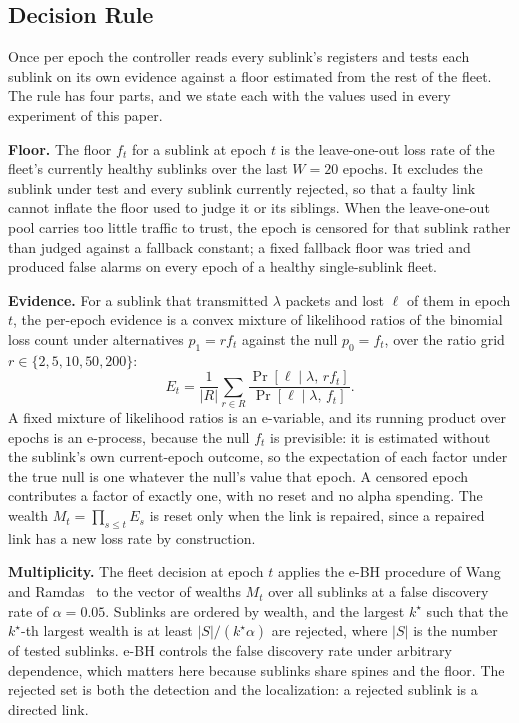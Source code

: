 \subsection{Decision Rule}
\label{sec:decision}

Once per epoch the controller reads every sublink's registers and tests each sublink on its own evidence against a floor estimated from the rest of the fleet. The rule has four parts, and we state each with the values used in every experiment of this paper.

\textbf{Floor.} The floor $f_t$ for a sublink at epoch $t$ is the leave-one-out loss rate of the fleet's currently healthy sublinks over the last $W=20$ epochs. It excludes the sublink under test and every sublink currently rejected, so that a faulty link cannot inflate the floor used to judge it or its siblings. When the leave-one-out pool carries too little traffic to trust, the epoch is censored for that sublink rather than judged against a fallback constant; a fixed fallback floor was tried and produced false alarms on every epoch of a healthy single-sublink fleet.

\textbf{Evidence.} For a sublink that transmitted $\lambda$ packets and lost $\ell$ of them in epoch $t$, the per-epoch evidence is a convex mixture of likelihood ratios of the binomial loss count under alternatives $p_1 = r f_t$ against the null $p_0 = f_t$, over the ratio grid $r \in \{2, 5, 10, 50, 200\}$:
\begin{equation}
E_t = \frac{1}{|R|}\sum_{r\in R}\frac{\Pr\!\left[\ell \mid \lambda,\, r f_t\right]}{\Pr\!\left[\ell \mid \lambda,\, f_t\right]}.
\label{eq:evalue}
\end{equation}
A fixed mixture of likelihood ratios is an e-variable, and its running product over epochs is an e-process, because the null $f_t$ is previsible: it is estimated without the sublink's own current-epoch outcome, so the expectation of each factor under the true null is one whatever the null's value that epoch. A censored epoch contributes a factor of exactly one, with no reset and no alpha spending. The wealth $M_t = \prod_{s \le t} E_s$ is reset only when the link is repaired, since a repaired link has a new loss rate by construction.

\textbf{Multiplicity.} The fleet decision at epoch $t$ applies the e-BH procedure of Wang and Ramdas~\cite{ebh} to the vector of wealths $M_t$ over all sublinks at a false discovery rate of $\alpha = 0.05$. Sublinks are ordered by wealth, and the largest $k^\star$ such that the $k^\star$-th largest wealth is at least $|S|/(k^\star \alpha)$ are rejected, where $|S|$ is the number of tested sublinks. e-BH controls the false discovery rate under arbitrary dependence, which matters here because sublinks share spines and the floor. The rejected set is both the detection and the localization: a rejected sublink is a directed link.


